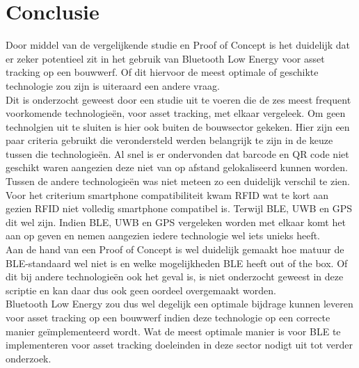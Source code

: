 
\chapter{Conclusie}%
\label{ch:conclusie}


Door middel van de vergelijkende studie en Proof of Concept is het duidelijk dat er zeker potentieel zit in het gebruik van Bluetooth Low Energy voor asset tracking op een bouwwerf. Of dit hiervoor de meest optimale of geschikte technologie zou zijn is uiteraard een andere vraag.\\

Dit is onderzocht geweest door een studie uit te voeren die de zes meest frequent voorkomende technologieën, voor asset tracking, met elkaar vergeleek. Om geen technolgien uit te sluiten is hier ook buiten de bouwsector gekeken. Hier zijn een paar criteria gebruikt die verondersteld werden belangrijk te zijn in de keuze tussen die technologieën. Al snel is er ondervonden dat barcode en QR code niet geschikt waren aangezien deze niet van op afstand gelokaliseerd kunnen worden. Tussen de andere technologieën was niet meteen zo een duidelijk verschil te zien. Voor het criterium smartphone compatibiliteit kwam RFID wat te kort aan gezien RFID niet volledig smartphone compatibel is. Terwijl BLE, UWB en GPS dit wel zijn. Indien BLE, UWB en GPS vergeleken worden met elkaar komt het aan op geven en nemen aangezien iedere technologie wel iets unieks heeft. \\

Aan de hand van een Proof of Concept is wel duidelijk gemaakt hoe matuur de BLE-standaard wel niet is en welke mogelijkheden BLE heeft out of the box. Of dit bij andere technologieën ook het geval is, is niet onderzocht geweest in deze scriptie en kan daar dus ook geen oordeel overgemaakt worden.\\

Bluetooth Low Energy zou dus wel degelijk een optimale bijdrage kunnen leveren voor asset tracking op een bouwwerf indien deze technologie op een correcte manier geïmplementeerd wordt. Wat de meest optimale manier is voor BLE te implementeren voor asset tracking doeleinden in deze sector nodigt uit tot verder onderzoek.

